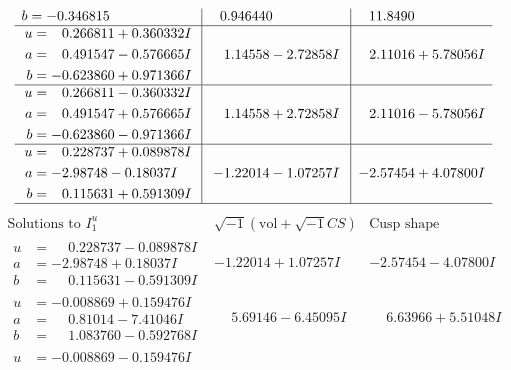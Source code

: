 \documentclass[1p]{elsarticle_modified}
\theoremstyle{definition}
\newcommand{\I}{\sqrt{-1}}
\begin{document}
$$\begin{array}{c|c|c}
\begin{aligned}
b &= -0.346815\phantom{ +0.000000I}\end{aligned}
 & \phantom{-}0.946440\phantom{ +0.000000I} & \phantom{-}11.8490\phantom{ +0.000000I} \\ \hline\begin{aligned}
u &= \phantom{-}0.266811 + 0.360332 I \\
a &= \phantom{-}0.491547 - 0.576665 I \\
b &= -0.623860 + 0.971366 I\end{aligned}
 & \phantom{-}1.14558 - 2.72858 I & \phantom{-}2.11016 + 5.78056 I \\ \hline\begin{aligned}
u &= \phantom{-}0.266811 - 0.360332 I \\
a &= \phantom{-}0.491547 + 0.576665 I \\
b &= -0.623860 - 0.971366 I\end{aligned}
 & \phantom{-}1.14558 + 2.72858 I & \phantom{-}2.11016 - 5.78056 I \\ \hline\begin{aligned}
u &= \phantom{-}0.228737 + 0.089878 I \\
a &= -2.98748 - 0.18037 I \\
b &= \phantom{-}0.115631 + 0.591309 I\end{aligned}
 & -1.22014 - 1.07257 I & -2.57454 + 4.07800 I\\
 \hline 
 \end{array}$$\newpage$$\begin{array}{c|c|c}  
\text{Solutions to }I^u_{1}& \I (\text{vol} + \sqrt{-1}CS) & \text{Cusp shape}\\
 \hline 
\begin{aligned}
u &= \phantom{-}0.228737 - 0.089878 I \\
a &= -2.98748 + 0.18037 I \\
b &= \phantom{-}0.115631 - 0.591309 I\end{aligned}
 & -1.22014 + 1.07257 I & -2.57454 - 4.07800 I \\ \hline\begin{aligned}
u &= -0.008869 + 0.159476 I \\
a &= \phantom{-}0.81014 - 7.41046 I \\
b &= \phantom{-}1.083760 - 0.592768 I\end{aligned}
 & \phantom{-}5.69146 - 6.45095 I & \phantom{-}6.63966 + 5.51048 I \\ \hline\begin{aligned}
u &= -0.008869 - 0.159476 I \\

\end{aligned}
\end{array}$$
\end{document}
